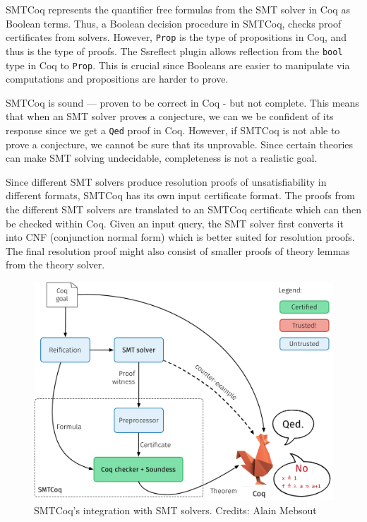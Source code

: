 \documentclass{article}
\begin{document}
	SMTCoq represents the quantifier free formulas 
	from the SMT solver in Coq as Boolean terms. Thus, 
	a Boolean decision procedure in SMTCoq, checks 
	proof certificates from solvers. However, 
	\texttt{Prop} is the type of propositions 
	in Coq, and thus is the type of proofs. 
	The Ssreflect plugin allows reflection from 
	the \texttt{bool} type in Coq to \texttt{Prop}.
	This is crucial since Booleans are easier to 
	manipulate via computations and propositions are 
	harder to prove.
	
	SMTCoq is sound --- proven to be correct in Coq 
	- but not complete. This means that when an 
	SMT solver proves a conjecture, we can we be 
	confident of its response since we get a 
	\texttt{Qed} proof in Coq. However, if 
	SMTCoq is not able to prove a conjecture, 
	we cannot be sure that its unprovable.
	Since certain theories can make SMT 
	solving undecidable, completeness is not a 
	realistic goal.	
	
	Since different SMT solvers produce resolution 
	proofs of unsatisfiability in different formats, 
	SMTCoq has its own input certificate format. 
	The proofs from the different SMT solvers are 
	translated to an SMTCoq certificate which 
	can then be checked within Coq. Given an input 
	query, the SMT solver first converts it into CNF
	(conjunction normal form) which is better 
	suited for resolution proofs. The final 
	resolution proof might also consist of smaller 
	proofs of theory lemmas from the theory solver. 
	
	\begin{figure}[t]
		\centering
		\includegraphics[scale=0.4]{tactic_cex.pdf}
		\caption{SMTCoq's integration with SMT solvers. Credits: Alain Mebsout}
		\label{fig:smtcoq}
	\end{figure}
	
\end{document}
